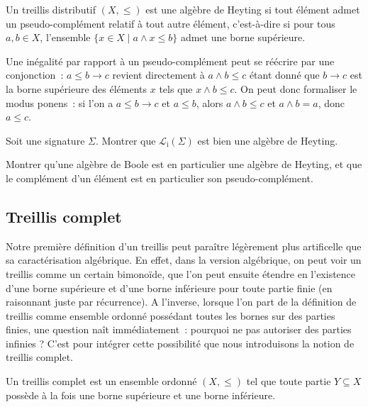 \begin{definition}
  Un treillis distributif $(X,\leq)$ est une algèbre de Heyting si tout élément
  admet un pseudo-complément relatif à tout autre élément, c'est-à-dire si
  pour tous $a,b\in X$, l'ensemble $\{x\in X \mid a \land x \leq b\}$ admet une
  borne supérieure.
\end{definition}

\begin{remark}
  Une inégalité par rapport à un pseudo-complément peut se réécrire par une
  conjonction~: $a\leq b \to c$ revient directement à $a\land b \leq c$ étant
  donné que $b \to c$ est la borne supérieure des éléments $x$ tels que
  $x\land b \leq c$. On peut donc formaliser le modus ponens~: si l'on a
  $a\leq b \to c$ et $a\leq b$, alors $a\land b \leq c$ et $a\land b = a$, donc
  $a\leq c$.
\end{remark}

\begin{exercise}
  Soit une signature $\Sigma$. Montrer que $\mathcal L_\mathrm i(\Sigma)$ est
  bien une algèbre de Heyting.
\end{exercise}

\begin{exercise}
  Montrer qu'une algèbre de Boole est en particulier une algèbre de Heyting, et
  que le complément d'un élément est en particulier son pseudo-complément.
\end{exercise}

\subsection{Treillis complet}

Notre première définition d'un treillis peut paraître légèrement plus
artificelle que sa caractérisation algébrique. En effet, dans la version
algébrique, on peut voir un treillis comme un certain bimonoïde, que l'on peut
ensuite étendre en l'existence d'une borne supérieure et d'une borne inférieure
pour toute partie finie (en raisonnant juste par récurrence). A l'inverse,
lorsque l'on part de la définition de treillis comme ensemble ordonné possédant
toutes les bornes sur des parties finies, une question naît immédiatement~:
pourquoi ne pas autoriser des parties infinies ? C'est pour intégrer cette
possibilité que nous introduisons la notion de treillis complet.

\begin{definition}
  Un treillis complet est un ensemble ordonné $(X,\leq)$ tel que toute partie
  $Y\subseteq X$ possède à la fois une borne supérieure et une borne inférieure.
\end{definition}

